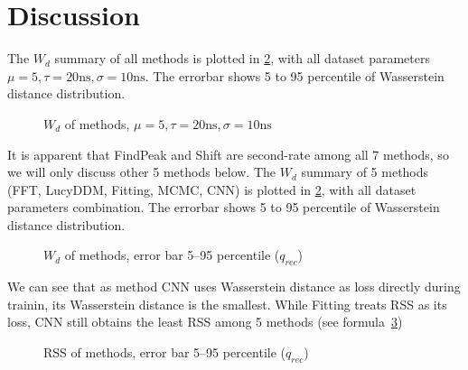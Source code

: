 \section{Discussion} %
\label{sec:discussion}

The $W_{d}$ summary of all methods is plotted in \ref{fig:chargesummary}, with all dataset parameters $\mu=5, \tau=20\mathrm{ns}, \sigma=10\mathrm{ns}$. The errorbar shows 5 to 95 percentile of Wasserstein distance distribution. 

\begin{figure}[H]
    \centering
    \scalebox{0.6}{}
    \caption{\label{fig:chargesummary} $W_{d}$ of methods, $\mu=5, \tau=20\mathrm{ns}, \sigma=10\mathrm{ns}$}
\end{figure}

It is apparent that FindPeak and Shift are second-rate among all 7 methods, so we will only discuss other 5 methods below. The $W_{d}$ summary of 5 methods (FFT, LucyDDM, Fitting, MCMC, CNN) is plotted in \ref{fig:chargesummary}, with all dataset parameters combination. The errorbar shows 5 to 95 percentile of Wasserstein distance distribution. 

\begin{figure}[H]
    \centering
    \resizebox{\textwidth}{!}{}
    \caption{\label{fig:chargesummary} $W_{d}$ of methods, error bar 5--95 percentile ($q_{rec}$)}
\end{figure}

We can see that as method CNN uses Wasserstein distance as loss directly during trainin, its Wasserstein distance is the smallest. While Fitting treats RSS as its loss, CNN still obtains the least RSS among 5 methods (see formula~\ref{fig:rsssummary})

\begin{figure}[H]
    \centering
    \resizebox{\textwidth}{!}{}
    \caption{\label{fig:rsssummary} RSS of methods, error bar 5--95 percentile ($q_{rec}$)}
\end{figure}


